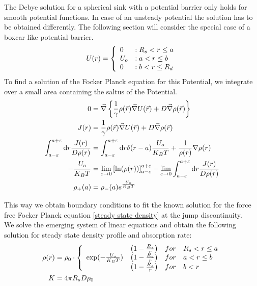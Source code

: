 The Debye solution for a spherical sink with a potential barrier only holds for smooth potential functions. In case of an unsteady potential the solution has to be obtained differently. The following section will consider the special case of a boxcar like potential barrier.
\begin{equation}
    U(r) = \left\{ \begin{array}{l l} 
        0 &: R_s < r \le a \\
        U_o &: a<r \le b \\
        0 &: b < r \le R_d
    \end{array} \right.
    \label{Boxcar_Potential}
\end{equation}
To find a solution of the Focker Planck equation for this Potential, we integrate over a small area containing the saltus of the Potential. 
\begin{align}
    0 &= \vec{\nabla} \left\{ \frac{1}{\gamma} \rho(\vec{r}) \vec{\nabla} U(\vec{r}) + D \vec{\nabla} \rho(\vec{r}) \right\} \\
    J(r) &=  \frac{1}{\gamma} \rho(\vec{r}) \vec{\nabla} U(\vec{r}) + D \vec{\nabla} \rho(\vec{r}) \\
    \int_{a - \varepsilon}^{a + \varepsilon} {\rm d} r \frac{J(r)}{D\rho(r)} &= \int_{a - \varepsilon}^{a + \varepsilon} {\rm d} r \delta(r - a) \frac{U_o}{K_B T} + \frac{1}{\rho(r)} \nabla \rho(r) \\
    -\frac{U_o}{K_B T} &= \lim_{\varepsilon \rightarrow 0} \left[ \ln (\rho(r) ) \right]_{a - \varepsilon}^{a + \varepsilon} - \lim_{\varepsilon \rightarrow 0}\int_{a - \varepsilon}^{a + \varepsilon} {\rm d} r \frac{J(r)}{D\rho(r)} \\
    \rho_{+}(a) &= \rho_{-}(a) e^{\frac{U_o}{K_B T}}
    \label{Boxcar_BC}
\end{align}

This way we obtain boundary conditions to fit the known solution for the force free Focker Planck equation \eqref{steady state density} at the jump discontinuity.\\
We solve the emerging system of linear equations and obtain the following solution for steady state density profile and absorption rate:
\begin{align}
    \rho(r) &= \rho_0 \cdot \left\{ \begin{array}{l l l}
                                    & \left(1 - \frac{R_s}{r} \right) & for \quad R_s < r \le a \\
            \exp(-\frac{U_o}{K_B T})  & \left(1 - \frac{R_s}{r} \right) & for \quad a < r \le b \\
                                    & \left(1 - \frac{R_s}{r} \right) & for \quad b < r 
                            \end{array} \right. \\
    K &= 4 \pi R_s D \rho_0
\end{align}

